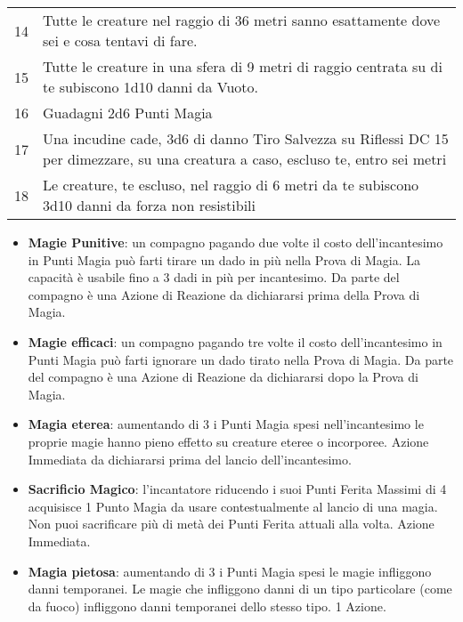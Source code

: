 \documentclass[landscape,10pt,a4paper]{article}
\begin{document}
\begin{multicols}{2}
\begin{dmbox}[title=Fallimento Critico Prova di Magia - pagina \pageref{magiefallimentocriticonellaprovadimagia}]
\begin{tabularx}{1\linewidth}{lX}
14 & Tutte le creature nel raggio di 36 metri sanno esattamente dove sei e cosa tentavi di fare.\\
15 & Tutte le creature in una sfera di 9 metri di raggio centrata su di te subiscono 1d10 danni da Vuoto.\\
16 & Guadagni 2d6 Punti Magia\\
17 & Una incudine cade, 3d6 di danno Tiro Salvezza su Riflessi DC 15 per dimezzare, su una creatura a caso, escluso te, entro sei metri\\
18 & Le creature, te escluso, nel raggio di 6 metri da te subiscono 3d10 danni da forza non resistibili
\end{tabularx}
\end{dmbox}


\begin{dmbox}[title=Alterare la Magia - pagina \pageref{magiealteraremagie}]
\begin{itemize}[leftmargin=0.5cm,itemsep=-1pt,parsep=0pt]

\item  \textbf{Magie Punitive}: un compagno pagando due volte il costo dell'incantesimo in Punti Magia può farti tirare un dado in più nella Prova di Magia. La capacità è usabile fino a 3 dadi in più per incantesimo. Da parte del compagno è una Azione di Reazione da dichiararsi prima della Prova di Magia.

\item  \textbf{Magie efficaci}: un compagno pagando tre volte il costo dell'incantesimo in Punti Magia può farti ignorare un dado tirato nella Prova di Magia. Da parte del compagno è una Azione di Reazione da dichiararsi dopo la Prova di Magia.

\item \textbf{Magia eterea}: aumentando di 3 i Punti Magia spesi nell'incantesimo le proprie magie hanno pieno effetto su creature eteree o incorporee. Azione Immediata da dichiararsi prima del lancio dell'incantesimo.

\item \textbf{Sacrificio Magico}: l'incantatore riducendo i suoi Punti Ferita Massimi di 4 acquisisce 1 Punto Magia da usare contestualmente al lancio di una magia. Non puoi sacrificare più di metà dei Punti Ferita attuali alla volta. Azione Immediata.

\item \textbf{Magia pietosa}: aumentando di 3 i Punti Magia spesi le magie infliggono danni temporanei.
Le magie che infliggono danni di un tipo particolare (come da fuoco) infliggono danni temporanei dello stesso tipo. 1 Azione.


\end{itemize}
\end{dmbox}
\end{multicols}
\end{document}
